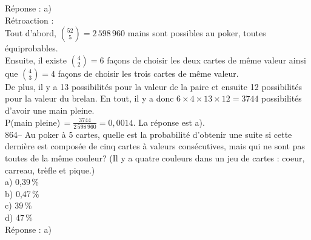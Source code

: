 ﻿\documentclass[letterpaper, 12pt]{article}
\begin{document}
R\'eponse : a)\\

R\'etroaction : \\
Tout d'abord, $\binom{52}{5}=2\,598\,960$ mains sont possibles au poker,
toutes \'equiprobables.  \\[2mm]
Ensuite, il existe $\binom{4}{2}=6$ fa\c cons de choisir les deux
cartes de m\^eme valeur ainsi que $\binom{4}{3}=4$ fa\c cons de choisir les
trois cartes de m\^eme valeur.  \\[2mm]
De plus, il y a 13 possibilit\'es pour la valeur de la paire et ensuite 12
possibilit\'es pour la valeur du brelan.  En tout, il y a donc
$6\times4\times13\times12=3744$ possibilit\'es d'avoir une main pleine.
\\[2mm]
P(main pleine)$\,=\frac{3744}{2\,598\,960}=0,0014$.  La r\'eponse est
a).\\[2mm]

864-- Au poker \`a 5 cartes, quelle est la probabilit\'e d'obtenir une suite
si cette derni\`ere est compos\'ee de cinq cartes \`a valeurs
cons\'ecutives, mais qui ne sont pas toutes de la m\^eme couleur? (Il y a
quatre couleurs dans un jeu de cartes : coeur, carreau, tr\`efle et
pique.)\\
a) 0,39\,\%\\
b) 0,47\,\%\\
c) 39\,\%\\
d) 47\,\%\\

R\'eponse : a)\\
\end{document}
